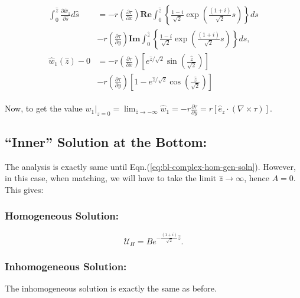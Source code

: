 \documentclass{article}
\newcommand{\pd}[2]{\frac{\partial{#1}}{\partial{#2}}}
\begin{document}
\begin{align}
 \begin{split}
  \int_{0}^{\hat{z} }\pd{\hat{w}_{1}}{\hat{s}} d\hat{s} &= -r \left(\pd{\tau}{x}\right) \mathbf{Re}\int_{0}^{\hat{z}} \left\{\frac{1-i}{\sqrt{2}}\exp{\left(\frac{(1+i)}{\sqrt{2}}s\right)} \right\} ds \\
  &- r\left(\pd{\tau}{y}\right)\mathbf{Im}\int_{0}^{\hat{z}} \left\{\frac{1-i}{\sqrt{2}}\exp{\left(\frac{(1+i)}{\sqrt{2}}s\right)} \right\} ds, \\
  \hat{w}_{1}(\hat{z}) - 0 &= - r\left(\pd{\tau}{x}\right)\left[ e^{\hat{z}/\sqrt{2}} \sin{\left(\frac{\hat{z}}{\sqrt{2}}\right)}  \right]\\
  &-r\left(\pd{\tau}{y}\right)\left[ 1 - e^{\hat{z}/\sqrt{2}} \cos{\left(\frac{\hat{z}}{\sqrt{2}}\right)}  \right]
 \end{split}
\end{align}

Now, to get the value $\boxed{w_{1}|_{z=0} =\lim_{\hat{z} \rightarrow -\infty}\hat{w}_{1} = - r\pd{\tau}{y} = r\left[\hat{e}_{z}\cdot(\nabla \times \tau) \right]}$.
\subsection{``Inner'' Solution at the Bottom:}
The analysis is exactly same until Eqn.(\ref{eq:bl-complex-hom-gen-soln}). However, in this case, when matching, we will have to take the limit $\hat{z}\rightarrow \infty$, hence $\boxed{A = 0}$. This gives:
\subsubsection{Homogeneous Solution:}
\begin{equation}\label{eq:bl-complex-hom-bottom}
 \mathcal{U}_{H} = B e^{-\frac{(1+i)}{\sqrt{2}}\hat{z}}.
\end{equation}
\subsubsection{Inhomogeneous Solution:}
The inhomogeneous solution is exactly the same as before.
\end{document}
